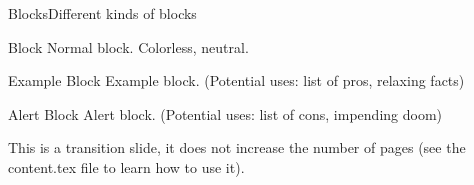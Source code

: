 \begin{frame}[c]{Blocks}{Different kinds of blocks}
	\begin{block}{Block}
		Normal block. Colorless, neutral.
	\end{block}

	\begin{exampleblock}{Example Block}
		Example block. (Potential uses: list of pros, relaxing facts)
	\end{exampleblock}

	\begin{alertblock}{Alert Block}
		Alert block. (Potential uses: list of cons, impending doom)
	\end{alertblock}
\end{frame}
	
	
	
\addtocounter{framenumber}{-1} %
{	
\begin{frame}[c]
\vspace{10em}
This is a transition slide, it does not increase the number of pages (see the content.tex file to learn how to use it).


\end{frame}
}
	
	

